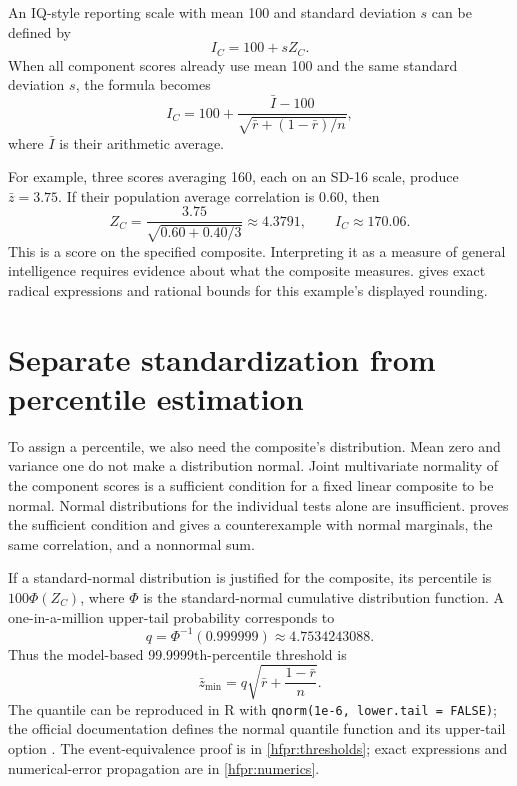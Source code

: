 An IQ-style reporting scale with mean 100 and standard deviation \(s\) can
be defined by
\begin{equation}
  I_C=100+sZ_C.
  \label{eq:reporting-scale}
\end{equation}
When all component scores already use mean 100 and the same standard
deviation \(s\), the formula becomes
\begin{equation}
  I_C=100+\frac{\bar I-100}{\sqrt{\bar r+(1-\bar r)/n}},
  \label{eq:iq-composite}
\end{equation}
where \(\bar I\) is their arithmetic average.

For example, three scores averaging 160, each on an SD-16 scale, produce
\(\bar z=3.75\). If their population average correlation is 0.60, then
\begin{equation}
  Z_C=\frac{3.75}{\sqrt{0.60+0.40/3}}\approx4.3791,
  \qquad I_C\approx170.06.
  \label{eq:worked-example}
\end{equation}
This is a score on the specified composite. Interpreting it as a measure of
general intelligence requires evidence about what the composite measures.
 gives exact radical expressions and rational bounds
for this example's displayed rounding.

\section{Separate standardization from percentile estimation}

To assign a percentile, we also need the composite's distribution. Mean zero
and variance one do not make a distribution normal. Joint multivariate
normality of the component scores is a sufficient condition for a fixed
linear composite to be normal. Normal distributions for the individual
tests alone are insufficient.
 proves the sufficient condition and gives a
counterexample with normal marginals, the same correlation, and a
nonnormal sum.

If a standard-normal distribution is justified for the composite, its
percentile is \(100\Phi(Z_C)\), where \(\Phi\) is the standard-normal
cumulative distribution function. A one-in-a-million upper-tail probability
corresponds to
\begin{equation}
  q=\Phi^{-1}(0.999999)\approx4.7534243088.
  \label{eq:quantile}
\end{equation}
Thus the model-based 99.9999th-percentile threshold is
\begin{equation}
  \boxed{\bar z_{\min}=q\sqrt{\bar r+\frac{1-\bar r}{n}}.}
  \label{eq:threshold}
\end{equation}
The quantile can be reproduced in R with
\texttt{qnorm(1e-6, lower.tail = FALSE)}; the official documentation defines
the normal quantile function and its upper-tail option \citep{rnormal}.
The event-equivalence proof is in \cref{hfpr:thresholds}; exact
expressions and numerical-error propagation are in \cref{hfpr:numerics}.

